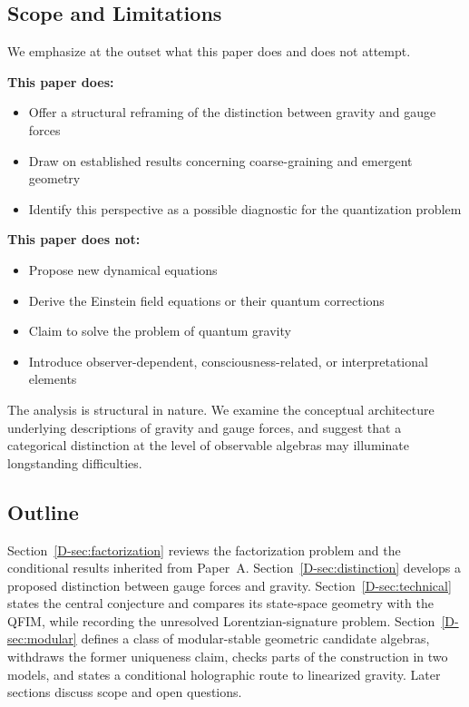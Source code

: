 \documentclass[12pt,a4paper,openany]{book}
\begin{document}
\subsection{Scope and Limitations}

We emphasize at the outset what this paper does and does not attempt.

\textbf{This paper does:}
\begin{itemize}
    \item Offer a structural reframing of the distinction between gravity and gauge forces
    \item Draw on established results concerning coarse-graining and emergent geometry
    \item Identify this perspective as a possible diagnostic for the quantization problem
\end{itemize}

\textbf{This paper does not:}
\begin{itemize}
    \item Propose new dynamical equations
    \item Derive the Einstein field equations or their quantum corrections
    \item Claim to solve the problem of quantum gravity
    \item Introduce observer-dependent, consciousness-related, or interpretational elements
\end{itemize}

The analysis is structural in nature. We examine the conceptual architecture underlying descriptions of gravity and gauge forces, and suggest that a categorical distinction at the level of observable algebras may illuminate longstanding difficulties.

\subsection{Outline}

Section~\ref{D-sec:factorization} reviews the factorization problem and the conditional results inherited from Paper~A. Section~\ref{D-sec:distinction} develops a proposed distinction between gauge forces and gravity. Section~\ref{D-sec:technical} states the central conjecture and compares its state-space geometry with the QFIM, while recording the unresolved Lorentzian-signature problem. Section~\ref{D-sec:modular} defines a class of modular-stable geometric candidate algebras, withdraws the former uniqueness claim, checks parts of the construction in two models, and states a conditional holographic route to linearized gravity. Later sections discuss scope and open questions.
\end{document}
